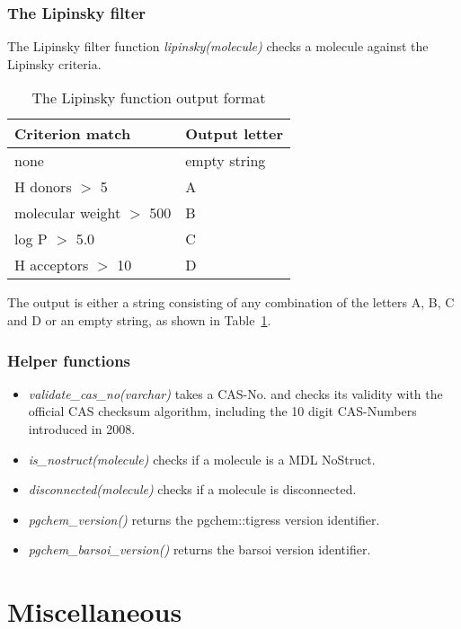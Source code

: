 \documentclass[a4paper]{article}
\begin{document}
\section{The Lipinsky filter}
The Lipinsky filter function \textit{lipinsky(molecule)} checks a molecule against the Lipinsky criteria.

\begin{table}[h]
\begin{tabular}{|l|l|}
\hline 
	\textbf{Criterion match} & \textbf{Output letter}\\
	\hline 
  none	& empty string\\
  \hline 
  H donors $>$ 5	& A\\
  \hline 
  molecular weight $>$ 500	& B\\
  \hline 
  log P $>$ 5.0	& C\\
  \hline 
  H acceptors $>$ 10	& D\\
  \hline 
\end{tabular}
\caption{The Lipinsky function output format}
\label{tbl:lipinsky_output}
\end{table}
The output is either a string consisting of any combination of the letters A, B, C and D or an empty string, as shown in Table~\ref{tbl:lipinsky_output}.

\section{Helper functions}
\begin{itemize}
\item\textit{validate\_cas\_no(varchar)} takes a CAS-No. and checks its validity with the official CAS checksum algorithm, including the 10 digit CAS-Numbers introduced in 2008.
\item\textit{is\_nostruct(molecule)} checks if a molecule is a MDL NoStruct.
\item\textit{disconnected(molecule)} checks if a molecule is disconnected.
\item\textit{pgchem\_version()} returns the pgchem::tigress version identifier.
\item\textit{pgchem\_barsoi\_version()} returns the barsoi version identifier.
\end{itemize}
\part{Miscellaneous}
\end{document}
